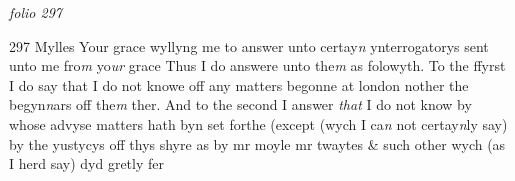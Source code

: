\documentclass[12pt, a4paper]{book}
\begin{document}
\textit{folio 297}



{\color{Mahogany}297} Mylles Your grace wyllyng me to answer unto certay\textit{n} ynterrogatorys sent unto me fro\textit{m} yo\textit{ur} grace Thus I do answere unto the\textit{m} as folowyth.   To the ffyrst I do say that I do not knowe off any matters begonne at london  nother the begyn\textit{n}ars off the\textit{m} ther.  
				\marginpar[\vspace{0.5cm}{\textcolor{Gray}{2}}]{}
			 And to the second I answer \textit{that} I do not know by whose advyse matters hath byn set forthe (except (wych I ca\textit{n} not certay\textit{n}ly say) by the yustycys off thys shyre as by mr moyle mr twaytes \& such other wych (as I herd say) dyd gretly fer \textit{}
			
\end{document}
